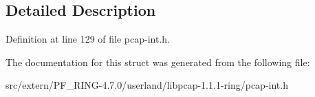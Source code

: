 \subsection{Detailed Description}


Definition at line 129 of file pcap-\/int.h.



The documentation for this struct was generated from the following file:\begin{DoxyCompactItemize}
\item 
src/extern/PF\_\-RING-\/4.7.0/userland/libpcap-\/1.1.1-\/ring/pcap-\/int.h\end{DoxyCompactItemize}
